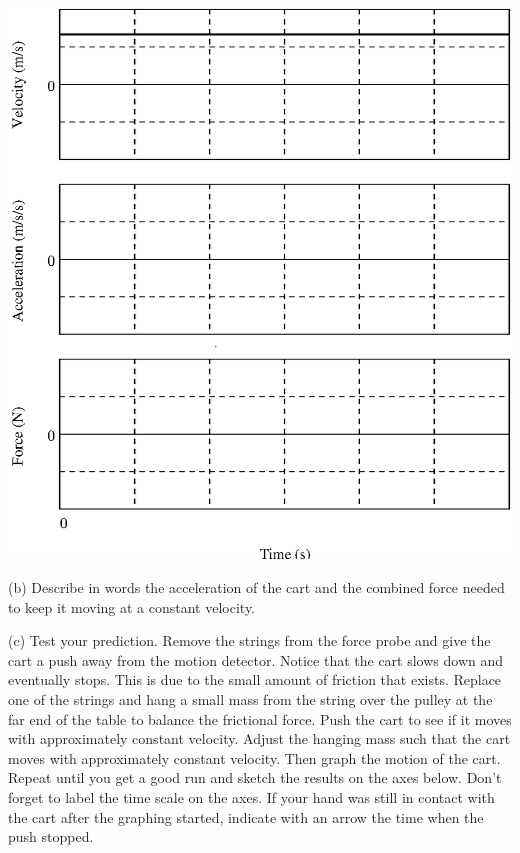 \vspace{0.3cm}
{\par\centering \includegraphics{combining/combining_fig1.eps} \par}
\vspace{0.3cm}

(b) Describe in words the acceleration of the cart and the combined force needed
to keep it moving at a constant velocity.
\vspace{15mm}

(c) Test your prediction. Remove the strings from the force probe and give the
cart a push away from the motion detector. Notice that the cart slows down and
eventually stops. This is due to the small amount of friction that exists. Replace
one of the strings and hang a small mass from the string over the pulley at
the far end of the table to balance the frictional force. Push the cart to see
if it moves with approximately constant velocity. Adjust the hanging mass such
that the cart moves with approximately constant velocity. Then graph the motion
of the cart. Repeat until you get a good run and sketch the results on the axes
below. Don't forget to label the time scale on the axes. If your hand was still
in contact with the cart after the graphing started, indicate with an arrow
the time when the push stopped.


